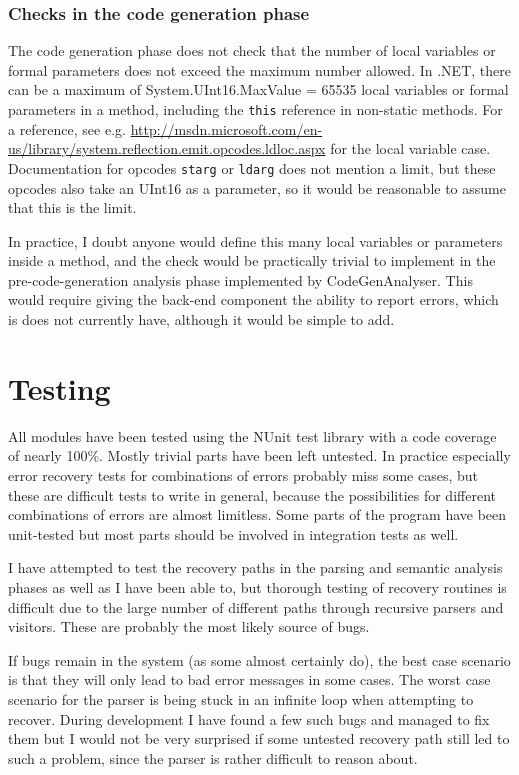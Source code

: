\documentclass[a4paper,11pt]{article}
\begin{document}
\subsubsection{Checks in the code generation phase}

The code generation phase does not check that the number of local variables or formal parameters does not exceed the maximum number allowed. In .NET, there can be a maximum of System.UInt16.MaxValue = 65535 local variables or formal parameters in a method, including the \verb,this, reference in non-static methods. For a reference, see e.g. \url{http://msdn.microsoft.com/en-us/library/system.reflection.emit.opcodes.ldloc.aspx} for the local variable case. Documentation for opcodes \verb,starg, or \verb,ldarg, does not mention a limit, but these opcodes also take an UInt16 as a parameter, so it would be reasonable to assume that this is the limit.

In practice, I doubt anyone would define this many local variables or parameters inside a method, and the check would be practically trivial to implement in the pre-code-generation analysis phase implemented by CodeGenAnalyser. This would require giving the back-end component the ability to report errors, which is does not currently have, although it would be simple to add.

\section{Testing}

All modules have been tested using the NUnit test library with a code coverage of nearly 100\%. Mostly trivial parts have been left untested. In practice especially error recovery tests for combinations of errors probably miss some cases, but these are difficult tests to write in general, because the possibilities for different combinations of errors are almost limitless. Some parts of the program have been unit-tested but most parts should be involved in integration tests as well.

I have attempted to test the recovery paths in the parsing and semantic analysis phases as well as I have been able to, but thorough testing of recovery routines is difficult due to the large number of different paths through recursive parsers and visitors. These are probably the most likely source of bugs.

If bugs remain in the system (as some almost certainly do), the best case scenario is that they will only lead to bad error messages in some cases. The worst case scenario for the parser is being stuck in an infinite loop when attempting to recover. During development I have found a few such bugs and managed to fix them but I would not be very surprised if some untested recovery path still led to such a problem, since the parser is rather difficult to reason about.
\end{document}
